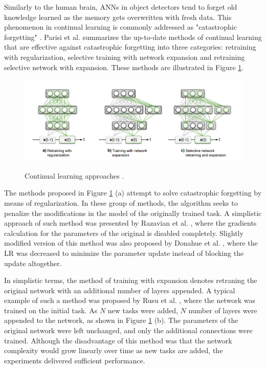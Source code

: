 \documentclass[english, 12pt, a4paper, elec, utf8, a-1b, online]{aaltothesis}
\begin{document}
Similarly to the human brain, ANNs in object detectors tend to forget old knowledge learned as the memory gets overwritten with fresh data. This phenomenon in continual learning is commonly addressed as "catastrophic forgetting" \cite{Parisi2018}. Parisi et al. summarizes the up-to-date methods of continual learning that are effective against catastrophic forgetting into three categories: retraining with regularization, selective training with network expansion and retraining selective network with expansion. These methods are illustrated in Figure \ref{continual}. 

\begin{figure}[htb]
	\begin{center}
		\includegraphics[width=16cm]{./continual.png}
	\end{center}
	\caption{Continual learning approaches
\cite{Parisi2018}.}
	\begin{center}
		\label{continual}
	\end{center}
\end{figure}
\FloatBarrier

The methods proposed in Figure \ref{continual} (a) attempt to solve catastrophic forgetting by means of regularization. In these group of methods, the algorithm seeks to penalize the modifications in the model of the originally trained task. A simplistic approach of such method was presented by Razavian et al.  \cite{Razavian2014}, where the gradients calculation for the parameters of the original is disabled completely. Slightly modified version of this method was also proposed by Donahue et al. \cite{Donahue2013}, where the LR was decreased to minimize the parameter update instead of blocking the update altogether. 


In simplistic terms, the method of training with expansion denotes retraning the original network with an additional number of layers appended. A typical example of such a method was proposed by Rusu et al. \cite{Rusu2016}, where the network was trained on the initial task. As $N$ new tasks were added, $N$ number of layers were appended to the network, as shown in Figure \ref{continual} (b). The parameters of the original network were left unchanged, and only the additional connections were trained. Although the disadvantage of this method was that the network complexity would grow linearly over time as new tasks are added, the experiments delivered sufficient performance. 
\end{document}
